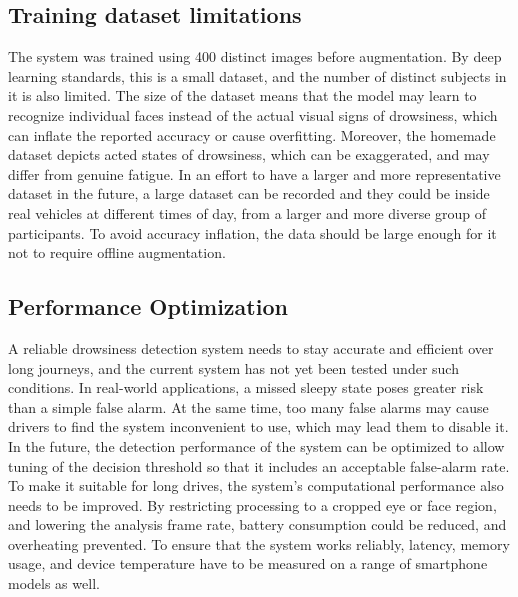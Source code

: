 \documentclass[pdflatex,sn-mathphys-num]{sn-jnl}
\theoremstyle{thmstyleone}%
\theoremstyle{thmstyletwo}%
\theoremstyle{thmstylethree}%
\begin{document}
	\subsection{Training dataset limitations}\label{subsec6.1}
	The system was trained using 400 distinct images before augmentation. By deep learning standards, this is a small dataset, and the number of distinct subjects in it is also limited. The size of the dataset means that the model may learn to recognize individual faces instead of the actual visual signs of drowsiness, which can inflate the reported accuracy or cause overfitting. Moreover, the homemade dataset depicts acted states of drowsiness, which can be exaggerated, and may differ from genuine fatigue. 
	In an effort to have a larger and more representative dataset in the future, a large dataset can be recorded and they could be inside real vehicles at different times of day, from a larger and more diverse group of participants. To avoid accuracy inflation, the data should be large enough for it not to require offline augmentation.
	
	\subsection{Performance Optimization}\label{subsec6.2}
	A reliable drowsiness detection system needs to stay accurate and efficient over long journeys, and the current system has not yet been tested under such conditions. In real-world applications, a missed sleepy state poses greater risk than a simple false alarm. At the same time, too many false alarms may cause drivers to find the system inconvenient to use, which may lead them to disable it.
	In the future, the detection performance of the system can be optimized to allow tuning of the decision threshold so that it includes an acceptable false-alarm rate. To make it suitable for long drives, the system’s computational performance also needs to be improved. By restricting processing to a cropped eye or face region, and lowering the analysis frame rate, battery consumption could be reduced, and overheating prevented. To ensure that the system works reliably, latency, memory usage, and device temperature  have to be measured on a range of smartphone models as well.
	
	
\end{document}
